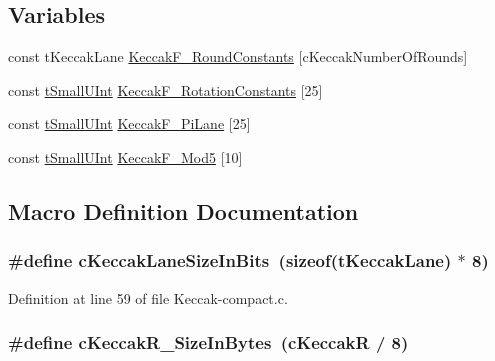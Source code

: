 \subsection*{Variables}
\begin{DoxyCompactItemize}
\item 
const t\-Keccak\-Lane \hyperlink{Keccak-compact_8c_a9c1d4eb2917662d6ced7b63d0d5b8806}{Keccak\-F\-\_\-\-Round\-Constants} \mbox{[}c\-Keccak\-Number\-Of\-Rounds\mbox{]}
\item 
const \hyperlink{Keccak-compact_8c_a45959559b5cbc9df13f4f87b8fee86af}{t\-Small\-U\-Int} \hyperlink{Keccak-compact_8c_aa250efc71ed09df8e3a7da9284b68814}{Keccak\-F\-\_\-\-Rotation\-Constants} \mbox{[}25\mbox{]}
\item 
const \hyperlink{Keccak-compact_8c_a45959559b5cbc9df13f4f87b8fee86af}{t\-Small\-U\-Int} \hyperlink{Keccak-compact_8c_ad3deb5317a026ca237c4bb00517ed613}{Keccak\-F\-\_\-\-Pi\-Lane} \mbox{[}25\mbox{]}
\item 
const \hyperlink{Keccak-compact_8c_a45959559b5cbc9df13f4f87b8fee86af}{t\-Small\-U\-Int} \hyperlink{Keccak-compact_8c_af53e58ad0f1df73b21262d564490c661}{Keccak\-F\-\_\-\-Mod5} \mbox{[}10\mbox{]}
\end{DoxyCompactItemize}


\subsection{Macro Definition Documentation}
\hypertarget{Keccak-compact_8c_aa8261644be5dfc79cb192506a4e4e6dc}{
\subsubsection[{c\-Keccak\-Lane\-Size\-In\-Bits}]{\setlength{\rightskip}{0pt plus 5cm}\#define c\-Keccak\-Lane\-Size\-In\-Bits~(sizeof(t\-Keccak\-Lane) $\ast$ 8)}}\label{Keccak-compact_8c_aa8261644be5dfc79cb192506a4e4e6dc}


Definition at line 59 of file Keccak-\/compact.\-c.

\hypertarget{Keccak-compact_8c_ad6082b5565384a6caf3ec77eba2e8568}{
\subsubsection[{c\-Keccak\-R\-\_\-\-Size\-In\-Bytes}]{\setlength{\rightskip}{0pt plus 5cm}\#define c\-Keccak\-R\-\_\-\-Size\-In\-Bytes~({\bf c\-Keccak\-R} / 8)}}\label{Keccak-compact_8c_ad6082b5565384a6caf3ec77eba2e8568}


